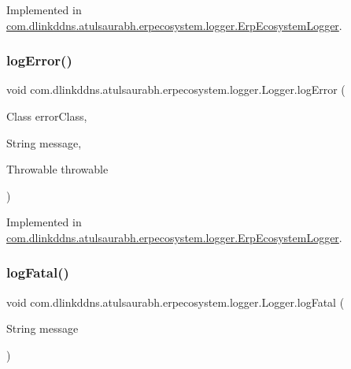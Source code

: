 Implemented in \mbox{\hyperlink{classcom_1_1dlinkddns_1_1atulsaurabh_1_1erpecosystem_1_1logger_1_1_erp_ecosystem_logger_aa561000b385ff39f9d8171a91e831c2d}{com.\+dlinkddns.\+atulsaurabh.\+erpecosystem.\+logger.\+Erp\+Ecosystem\+Logger}}.

\mbox{\label{interfacecom_1_1dlinkddns_1_1atulsaurabh_1_1erpecosystem_1_1logger_1_1_logger_a0f7488f980f029dfa98c465877b3fbe6}} 
\subsubsection{\texorpdfstring{log\+Error()}{logError()}\hspace{0.1cm}{\footnotesize\ttfamily [3/3]}}
{\footnotesize\ttfamily void com.\+dlinkddns.\+atulsaurabh.\+erpecosystem.\+logger.\+Logger.\+log\+Error (\begin{DoxyParamCaption}\item[{Class}]{error\+Class,  }\item[{String}]{message,  }\item[{Throwable}]{throwable }\end{DoxyParamCaption})}



Implemented in \mbox{\hyperlink{classcom_1_1dlinkddns_1_1atulsaurabh_1_1erpecosystem_1_1logger_1_1_erp_ecosystem_logger_a25316b3eabb66eaecba45d638c420b2b}{com.\+dlinkddns.\+atulsaurabh.\+erpecosystem.\+logger.\+Erp\+Ecosystem\+Logger}}.

\mbox{\label{interfacecom_1_1dlinkddns_1_1atulsaurabh_1_1erpecosystem_1_1logger_1_1_logger_ab1796d8ce066433e34409055fd5e7100}} 
\subsubsection{\texorpdfstring{log\+Fatal()}{logFatal()}\hspace{0.1cm}{\footnotesize\ttfamily [1/3]}}
{\footnotesize\ttfamily void com.\+dlinkddns.\+atulsaurabh.\+erpecosystem.\+logger.\+Logger.\+log\+Fatal (\begin{DoxyParamCaption}\item[{String}]{message }\end{DoxyParamCaption})}


